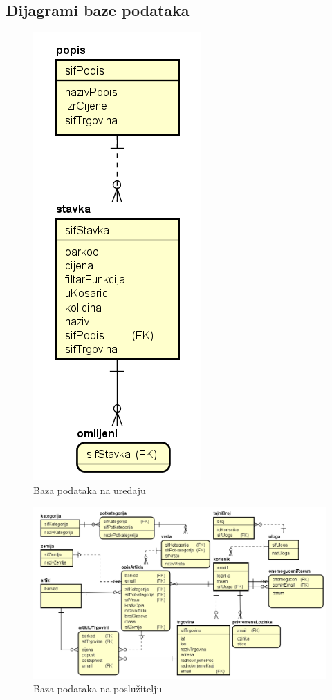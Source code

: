 			\subsection{Dijagrami baze podataka}
		\begin{figure}[H]
		    \centering
			\includegraphics[scale=0.4]{dijagrami/db_uredaj.png}
			\caption{Baza podataka na uređaju}
			\label{fig:db_uredaj}
		\end{figure}
		
		\begin{figure}[H]
		    \centering
			\includegraphics[width=.9\linewidth]{dijagrami/db_posluzitelj.png}
			\caption{Baza podataka na poslužitelju}
			\label{fig:db_posluzitelj}
		\end{figure}
			
